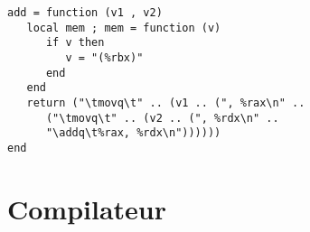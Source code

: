 \documentclass{article}
\begin{document}
\begin{lstlisting}[belowcaptionskip = -1\baselineskip]
add = function (v1 , v2) 
   local mem ; mem = function (v) 
      if v then 
         v = "(%rbx)" 
      end 
   end 
   return ("\tmovq\t" .. (v1 .. (", %rax\n" .. 
      ("\tmovq\t" .. (v2 .. (", %rdx\n" .. 
      "\addq\t%rax, %rdx\n")))))) 
end 
\end{lstlisting}

\newpage
\section{Compilateur}
\end{document}

